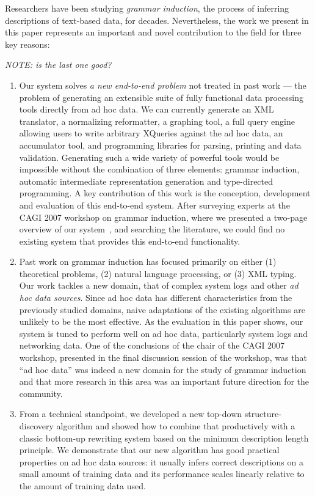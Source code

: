 Researchers have been studying {\em grammar induction}, the process of
inferring descriptions of text-based data, for decades.  Nevertheless,
the work we present in this paper represents an important and novel 
contribution to the field for three key reasons:

{\em NOTE: is the last one good?}

\begin{enumerate}
\item Our system solves {\em a new end-to-end problem} not treated in
past work --- the problem of generating an extensible suite of fully
functional data processing tools directly from ad hoc data.  We can
currently generate an XML translator, a normalizing reformatter, a
graphing tool, a full query engine allowing users to write arbitrary XQueries
against the ad hoc data, an accumulator tool, and
programming libraries for parsing, printing and data validation.
Generating such a wide variety of powerful tools would be impossible
without the combination of three elements: grammar induction,
automatic intermediate representation generation and type-directed
programming.  A key contribution of this work is the conception,
development and evaluation of this end-to-end system.  After surveying
experts at the CAGI 2007 workshop on grammar induction, where we
presented a two-page overview of our system~\cite{burke+:cagi07}, and
searching the literature, we could find no existing system that
provides this end-to-end functionality.

\item Past work on grammar induction has focused primarily on
either (1) theoretical problems, (2) natural language processing, or
(3) XML typing.  Our work tackles a new domain, that of complex system
logs and other {\em ad hoc data sources}.  Since ad hoc data has
different characteristics from the previously studied domains, naive
adaptations of the existing algorithms are unlikely to be the most
effective.  As the evaluation in this paper shows, our system is tuned
to perform well on ad hoc data, particularly system logs and
networking data.  One of the conclusions of the chair of the CAGI 2007
workshop, presented in the final discussion session of the workshop,
was that ``ad hoc data'' was indeed a new domain for the study of
grammar induction and that more research in this area was an important
future direction for the community.

\item  From a technical standpoint, we developed a new top-down 
structure-discovery algorithm and showed how to combine that 
productively with a classic bottom-up rewriting system based on 
the minimum description length principle. We demonstrate that our
new algorithm has good practical properties on ad hoc data sources:  
it usually infers correct descriptions on a small amount of training
data and its performance scales linearly relative to the amount of training
data used.
\end{enumerate}

